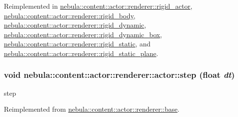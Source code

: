 Reimplemented in \hyperlink{classnebula_1_1content_1_1actor_1_1renderer_1_1rigid__actor_a9d1be32a4ba87de355247219e4e9f104}{nebula::content::actor::renderer::rigid\_\-actor}, \hyperlink{classnebula_1_1content_1_1actor_1_1renderer_1_1rigid__body_a24b3051c9db06008d8698cc97eff21e0}{nebula::content::actor::renderer::rigid\_\-body}, \hyperlink{classnebula_1_1content_1_1actor_1_1renderer_1_1rigid__dynamic_a6c0f68639544063b7a7bf404fdbc1370}{nebula::content::actor::renderer::rigid\_\-dynamic}, \hyperlink{classnebula_1_1content_1_1actor_1_1renderer_1_1rigid__dynamic__box_a45f52d77d1f89e86d5ac3cd2d0beb4c0}{nebula::content::actor::renderer::rigid\_\-dynamic\_\-box}, \hyperlink{classnebula_1_1content_1_1actor_1_1renderer_1_1rigid__static_a33ba501805701c5069344a5126830898}{nebula::content::actor::renderer::rigid\_\-static}, and \hyperlink{classnebula_1_1content_1_1actor_1_1renderer_1_1rigid__static__plane_ac0d85518481b3d6fc0d15402c6878ed9}{nebula::content::actor::renderer::rigid\_\-static\_\-plane}.\hypertarget{classnebula_1_1content_1_1actor_1_1renderer_1_1actor_ab35c8c44d2603c17f4822cdef8be93bf}{
\subsubsection[{step}]{\setlength{\rightskip}{0pt plus 5cm}void nebula::content::actor::renderer::actor::step (float {\em dt})}}
\label{classnebula_1_1content_1_1actor_1_1renderer_1_1actor_ab35c8c44d2603c17f4822cdef8be93bf}


step 

Reimplemented from \hyperlink{classnebula_1_1content_1_1actor_1_1renderer_1_1base_afaa86ca71b54c9d548b073f0cf23a41b}{nebula::content::actor::renderer::base}.

